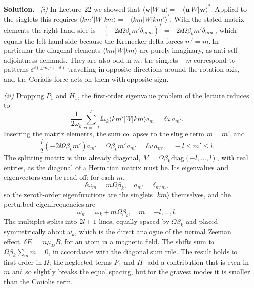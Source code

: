 \documentclass[a4paper,12pt]{paper}
\newenvironment{solution}{\par\noindent\textbf{Solution.}\ }{\par\medskip}
\begin{document}
\begin{solution}
\textit{(i)} In Lecture~22 we showed that $\langle\mathbf{w}|W|\mathbf{u}\rangle=-\langle\mathbf{u}|W|\mathbf{w}\rangle^{*}$.
Applied to the singlets this requires $\langle km'|W|km\rangle=-\langle km|W|km'\rangle^{*}$.
With the stated matrix elements the right-hand side is
$-(-2\ii\Omega\beta_{k}m'\delta_{m'm})^{*}=-2\ii\Omega\beta_{k}m'\delta_{mm'}$, which equals the
left-hand side because the Kronecker delta forces $m'=m$. In particular the diagonal elements
$\langle km|W|km\rangle$ are purely imaginary, as anti-self-adjointness demands. They are also
odd in $m$: the singlets $\pm m$ correspond to patterns $\ee^{\ii(\pm m\varphi+\omega t)}$
travelling in opposite directions around the rotation axis, and the Coriolis force acts on
them with opposite sign.

\medskip
\noindent\textit{(ii)} Dropping $P_{1}$ and $H_{1}$, the first-order eigenvalue problem of
the lecture reduces to
\begin{equation}
\frac{1}{2\omega_{k}}\sum_{m=-l}^{l}\ii\omega_{k}\langle km'|W|km\rangle a_{m}=\delta\omega\,a_{m'}.
\label{eq:21}
\end{equation}
Inserting the matrix elements, the sum collapses to the single term $m=m'$, and
\begin{equation}
\frac{\ii}{2}\left(-2\ii\Omega\beta_{k}m'\right)a_{m'}=\Omega\beta_{k}m'\,a_{m'}=\delta\omega\,a_{m'},
\quad -l\le m'\le l .
\label{eq:22}
\end{equation}
The splitting matrix is thus already diagonal, $M=\Omega\beta_{k}\,\mathrm{diag}(-l,\dots,l)$,
with real entries, as the diagonal of a Hermitian matrix must be. Its eigenvalues and eigenvectors can be read off: for each
$m$,
\begin{equation}
\delta\omega_{m}=m\Omega\beta_{k},\quad a_{m'}=\delta_{m'm},
\label{eq:23}
\end{equation}
so the zeroth-order eigenfunctions are the singlets $|km\rangle$ themselves, and the perturbed
eigenfrequencies are
\begin{equation}
\omega_{m}=\omega_{k}+m\Omega\beta_{k},\quad m=-l,\dots,l .
\label{eq:24}
\end{equation}
The multiplet splits into $2l+1$ lines, equally spaced by $\Omega\beta_{k}$ and placed
symmetrically about $\omega_{k}$, which is the direct analogue of the normal Zeeman effect,
$\delta E=m\mu_{B}B$, for an atom in a magnetic field. The shifts sum to
$\Omega\beta_{k}\sum_{m}m=0$, in accordance with the diagonal sum rule. The result holds to
first order in $\Omega$; the neglected terms $P_{1}$ and $H_{1}$ add a contribution that is
even in $m$ and so slightly breaks the equal spacing, but for the gravest modes it is smaller
than the Coriolis term.


\end{solution}
\end{document}
